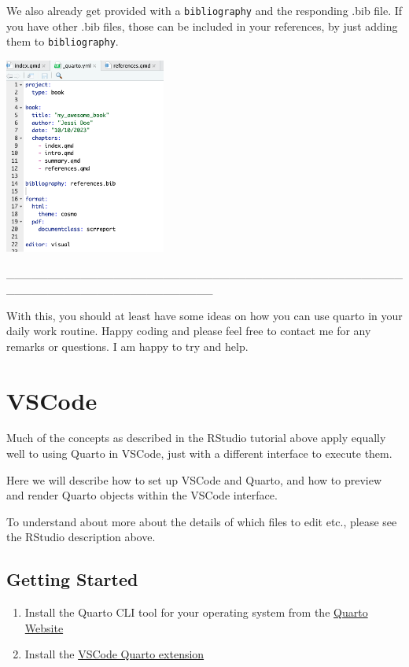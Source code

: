\documentclass[
  letterpaper,
  DIV=11,
  numbers=noendperiod]{scrreprt}
\providecommand{\tightlist}{%
  \setlength{\itemsep}{0pt}\setlength{\parskip}{0pt}}\usepackage{longtable,booktabs,array}
\begin{document}
We also already get provided with a \texttt{bibliography} and the
responding .bib file. If you have other .bib files, those can be
included in your references, by just adding them to
\texttt{bibliography}.

\includegraphics[width=2.08333in,height=\textheight]{img/quarto_intro/Screenshot 2023-10-12 at 11.41.30.png}

\_\_\_\_\_\_\_\_\_\_\_\_\_\_\_\_\_\_\_\_\_\_\_\_\_\_\_\_\_\_\_\_\_\_\_\_\_\_\_\_\_\_\_\_\_\_\_\_\_\_\_\_\_\_\_\_\_\_\_\_\_\_\_\_\_\_\_\_\_\_\_\_\_

With this, you should at least have some ideas on how you can use quarto
in your daily work routine. Happy coding and please feel free to contact
me for any remarks or questions. I am happy to try and help.

\hypertarget{vscode}{%
\section{VSCode}\label{vscode}}

Much of the concepts as described in the RStudio tutorial above apply
equally well to using Quarto in VSCode, just with a different interface
to execute them.

Here we will describe how to set up VSCode and Quarto, and how to
preview and render Quarto objects within the VSCode interface.

To understand about more about the details of which files to edit etc.,
please see the RStudio description above.

\hypertarget{getting-started-1}{%
\subsection{Getting Started}\label{getting-started-1}}

\begin{enumerate}
\def\labelenumi{\arabic{enumi}.}
\tightlist
\item
  Install the Quarto CLI tool for your operating system from the
  \href{https://quarto.org/docs/get-started/}{Quarto Website}
\item
  Install the
  \href{https://marketplace.visualstudio.com/items?itemName=quarto.quarto}{VSCode
  Quarto extension}
\end{enumerate}
\end{document}
